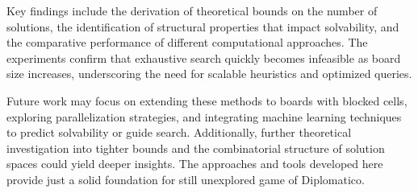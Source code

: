 \documentclass[conference]{IEEEtran}
\begin{document}
Key findings include the derivation of theoretical bounds on the number of solutions, the identification of structural properties that impact solvability, and the comparative performance of different computational approaches. The experiments confirm that exhaustive search quickly becomes infeasible as board size increases, underscoring the need for scalable heuristics and optimized queries.

Future work may focus on extending these methods to boards with blocked cells, exploring parallelization strategies, and integrating machine learning techniques to predict solvability or guide search. Additionally, further theoretical investigation into tighter bounds and the combinatorial structure of solution spaces could yield deeper insights. The approaches and tools developed here provide just a solid foundation for still unexplored game of Diplomatico.




\newpage
\appendices
\end{document}
